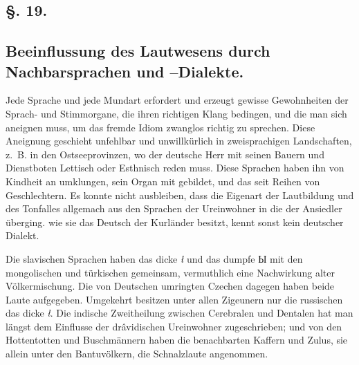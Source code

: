 {\label{sp.269}

\subsection*{§. 19.}\label{III.II.II.19}
\subsection*{Beeinflussung des Lautwesens durch Nachbarsprachen und –Dialekte.}
Jede Sprache und jede Mundart erfordert und erzeugt gewisse Gewohnheiten der Sprach- und Stimmorgane, die ihren richtigen Klang bedingen, und die man sich aneignen muss, um das fremde Idiom zwanglos richtig zu sprechen. Diese Aneignung geschieht unfehlbar und unwillkürlich in zweisprachigen Landschaften, z.~B. in den Ostseeprovinzen, wo der deutsche Herr mit seinen Bauern und Dienstboten Lettisch oder Esthnisch reden muss. Diese Sprachen haben ihn von Kindheit an umklungen, sein Organ mit gebildet, und das seit Reihen von Geschlechtern. Es konnte nicht ausbleiben, dass die Eigenart der Lautbildung und des Tonfalles allgemach aus den Sprachen der Ureinwohner in die der Ansiedler überging.  wie sie das Deutsch der Kurländer besitzt, kennt sonst kein deutscher Dialekt.

Die slavischen Sprachen haben das dicke \textit{ł} und das dumpfe Ы mit den mongolischen und türkischen gemeinsam, vermuthlich eine Nachwirkung alter Völkermischung. Die von Deutschen umringten Czechen dagegen haben beide Laute aufgegeben. Umgekehrt besitzen unter allen Zigeunern nur die russischen das dicke \textit{ł}.  Die indische Zweitheilung zwischen Cerebralen und Dentalen hat man längst dem Einflusse der drâvidischen Ureinwohner zugeschrieben; und von den Hottentotten und \label{fp.264} Buschmännern haben die benachbarten Kaffern und Zulus, sie allein unter den Bantuvölkern, die Schnalzlaute angenommen. 

}
